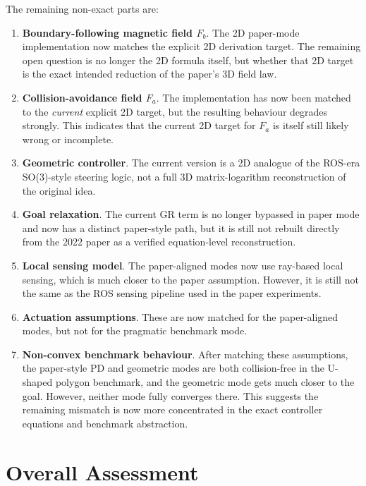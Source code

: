 \documentclass[11pt]{article}
\begin{document}
The remaining non-exact parts are:

\begin{enumerate}[leftmargin=*]
  \item \textbf{Boundary-following magnetic field \(F_b\)}.
  The 2D paper-mode implementation now matches the explicit 2D derivation
  target. The remaining open question is no longer the 2D formula itself, but
  whether that 2D target is the exact intended reduction of the paper’s 3D
  field law.

  \item \textbf{Collision-avoidance field \(F_a\)}.
  The implementation has now been matched to the \emph{current} explicit 2D
  target, but the resulting behaviour degrades strongly. This indicates that
  the current 2D target for \(F_a\) is itself still likely wrong or incomplete.

  \item \textbf{Geometric controller}.
  The current version is a 2D analogue of the ROS-era SO(3)-style steering
  logic, not a full 3D matrix-logarithm reconstruction of the original idea.

  \item \textbf{Goal relaxation}.
  The current GR term is no longer bypassed in paper mode and now has a distinct
  paper-style path, but it is still not rebuilt directly from the 2022 paper as
  a verified equation-level reconstruction.

  \item \textbf{Local sensing model}.
  The paper-aligned modes now use ray-based local sensing, which is much closer
  to the paper assumption. However, it is still not the same as the ROS sensing
  pipeline used in the paper experiments.

  \item \textbf{Actuation assumptions}.
  These are now matched for the paper-aligned modes, but not for the pragmatic
  benchmark mode.

  \item \textbf{Non-convex benchmark behaviour}.
  After matching these assumptions, the paper-style PD and geometric modes are
  both collision-free in the U-shaped polygon benchmark, and the geometric mode
  gets much closer to the goal. However, neither mode fully converges there.
  This suggests the remaining mismatch is now more concentrated in the exact
  controller equations and benchmark abstraction.
\end{enumerate}

\section*{Overall Assessment}
\end{document}

